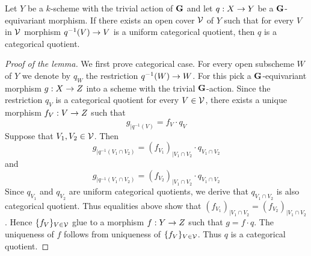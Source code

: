 \begin{lemma}\label{lemma:uniform_categorical_quotients_are_local_on_the_target}
Let $Y$ be a $k$-scheme with the trivial action of $\mathbf{G}$ and let $q:X\rightarrow Y$ be a $\mathbf{G}$-equivariant morphism. If there exists an open cover ${\mathcal V}$ of $Y$ such that for every $V$ in ${\mathcal V}$ morphism $q^{-1}(V)\rightarrow V$ is a uniform categorical quotient, then $q$ is a categorical quotient.
\end{lemma}
\begin{proof}[Proof of the lemma]
We first prove categorical case. For every open subscheme $W$ of $Y$ we denote by $q_W$ the restriction $q^{-1}(W)\rightarrow W$. For this pick a $\mathbf{G}$-equivariant morphism $g:X\rightarrow Z$ into a scheme with the trivial $\mathbf{G}$-action. Since the restriction $q_V$ is a categorical quotient for every $V\in {\mathcal V}$, there exists a unique morphism $f_V:V\rightarrow Z$ such that 
$$g_{\mid q^{-1}(V)} = f_V\cdot q_V$$
Suppose that $V_1,V_2\in {\mathcal V}$. Then
$$g_{\mid q^{-1}(V_1\cap V_2)} = \left(f_{V_1}\right)_{\mid V_1\cap V_2}\cdot q_{V_1\cap V_2}$$
and
$$g_{\mid q^{-1}(V_1\cap V_2)} = \left(f_{V_2}\right)_{\mid V_1\cap V_2}\cdot q_{V_1\cap V_2}$$
Since $q_{V_1}$ and $q_{V_2}$ are uniform categorical quotients, we derive that $q_{V_1\cap V_2}$ is also categorical quotient. Thus equalities above show that $\left(f_{V_1}\right)_{\mid V_1\cap V_2} = \left(f_{V_2}\right)_{\mid V_1\cap V_2}$. Hence $\{f_V\}_{V\in {\mathcal V}}$ glue to a morphism $f:Y\rightarrow Z$ such that $g= f\cdot q$. The uniqueness of $f$ follows from uniqueness of $\{f_V\}_{V\in {\mathcal V}}$. Thus $q$ is a categorical quotient.
\end{proof}

